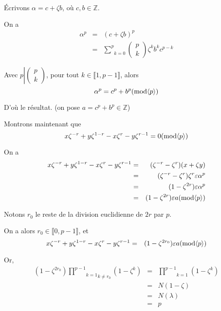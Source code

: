 {\'E}crivons $\alpha = c + \zeta b$, o{\`u} $c, b \in \mathbb{Z}$.

On a
\begin{eqnarray*}
  \alpha^p & = & (c + \zeta b)^p\\
  & = & \underset{k = 0}{\overset{p}{\sum}} \left( \begin{array}{c}
    p\\
    k
  \end{array} \right) \zeta^k b^k c^{p - k}
\end{eqnarray*}


Avec $p \left| \left( \begin{array}{c}
  p\\
  k
\end{array} \right) \right.$, pour tout $k \in \llbracket 1, p - 1
\rrbracket$, alors
\[ \alpha^p = c^p + b^p  (\operatorname{mod} \langle p \rangle) \]


D'o{\`u} le r{\'e}sultat. (on pose $a = c^p + b^p \in \mathbb{Z}$)

Montrons maintenant que
\[ x \zeta^{- r} + y \zeta^{1 - r} - x \zeta^r - y \zeta^{r - 1} = 0
   (\operatorname{mod} \langle p \rangle) \]


On a
\begin{eqnarray*}
  x \zeta^{- r} + y \zeta^{1 - r} - x \zeta^r - y \zeta^{r - 1} & = &
  (\zeta^{- r} - \zeta^r) (x + \zeta y)\\
  & = & (\zeta^{- r} - \zeta^r) \zeta^r \varepsilon \alpha^p\\
  & = & (1 - \zeta^{2 r})  \varepsilon \alpha^p\\
  & = & (1 - \zeta^{2 r})  \varepsilon a (\operatorname{mod} \langle p \rangle)
\end{eqnarray*}


Notons $r_0$ le reste de la division euclidienne de $2 r$ par $p$.

On a alors $r_0 \in \llbracket 0, p - 1 \rrbracket$, et
\begin{eqnarray*}
  x \zeta^{- r} + y \zeta^{1 - r} - x \zeta^r - y \zeta^{r - 1} & = & (1 -
  \zeta^{2 r_0})  \varepsilon a (\operatorname{mod} \langle p \rangle)
\end{eqnarray*}


Or,
\begin{eqnarray*}
  (1 - \zeta^{2 r_0}) \underset{k \neq r_0}{\underset{k = 1}{\overset{p -
  1}{\prod}}} (1 - \zeta^k) & = & \underset{}{\underset{k = 1}{\overset{p -
  1}{\prod}}} (1 - \zeta^k)\\
  & = & N (1 - \zeta)\\
  & = & N (\lambda)\\
  & = & p
\end{eqnarray*}


